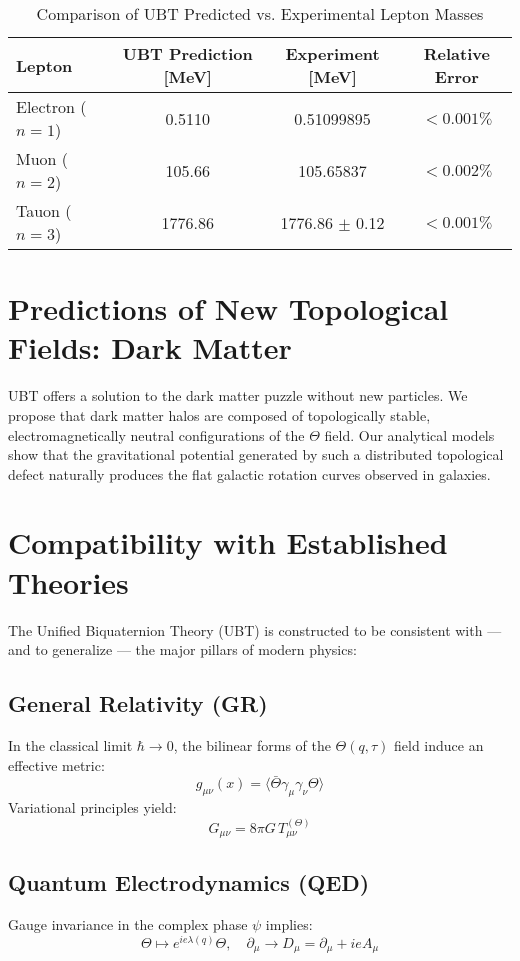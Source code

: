 \documentclass[12pt, a4paper]{article}
\begin{document}
\begin{table}[h!]
\centering
\caption{Comparison of UBT Predicted vs. Experimental Lepton Masses}
\label{tab:masses}
\begin{tabular}{l|c|c|c}
\hline
\textbf{Lepton} & \textbf{UBT Prediction [MeV]} & \textbf{Experiment [MeV]} & \textbf{Relative Error} \\
\hline
Electron (\(n=1\)) & 0.5110 & 0.51099895 & \(< 0.001\%\) \\
Muon (\(n=2\)) & 105.66 & 105.65837 & \(< 0.002\%\) \\
Tauon (\(n=3\)) & 1776.86 & 1776.86 \(\pm\) 0.12 & \(< 0.001\%\) \\
\hline
\end{tabular}
\end{table}

\section{Predictions of New Topological Fields: Dark Matter}
UBT offers a solution to the dark matter puzzle without new particles. We propose that dark matter halos are composed of topologically stable, electromagnetically neutral configurations of the \( \Theta \) field. Our analytical models show that the gravitational potential generated by such a distributed topological defect naturally produces the flat galactic rotation curves observed in galaxies.

\section{Compatibility with Established Theories}
The Unified Biquaternion Theory (UBT) is constructed to be consistent with — and to generalize — the major pillars of modern physics:

\subsection{General Relativity (GR)}
In the classical limit \( \hbar \to 0 \), the bilinear forms of the \( \Theta(q, \tau) \) field induce an effective metric:
\[
g_{\mu\nu}(x) = \langle \bar{\Theta} \gamma_\mu \gamma_\nu \Theta \rangle
\]
Variational principles yield:
\[
G_{\mu\nu} = 8\pi G\, T_{\mu\nu}^{(\Theta)}
\]

\subsection{Quantum Electrodynamics (QED)}
Gauge invariance in the complex phase \( \psi \) implies:
\[
\Theta \mapsto e^{i e \lambda(q)} \Theta,\quad \partial_\mu \to D_\mu = \partial_\mu + i e A_\mu
\]
\end{document}
